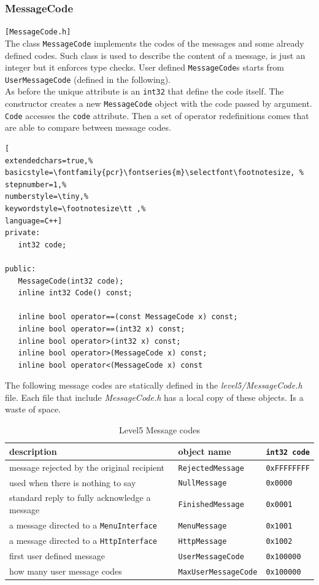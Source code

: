 \subsubsection{MessageCode}
\texttt{[MessageCode.h]}\\
The class \texttt{MessageCode} implements the codes of the messages and some already defined codes. Such class is used to describe the content of a message, is just an integer but it enforces type checks. User defined \texttt{MessageCode}s starts from \texttt{UserMessageCode} (defined in the following). \\


As before the unique attribute is an \texttt{int32} that define the code itself. The constructor creates a new \texttt{MessageCode} object with the code passed by argument. \texttt{Code} accesses the \texttt{code} attribute. Then a set of operator redefinitions comes that are able to compare between message codes.
\begin{lstlisting}[
extendedchars=true,%
basicstyle=\fontfamily{pcr}\fontseries{m}\selectfont\footnotesize, %
stepnumber=1,%
numberstyle=\tiny,%
keywordstyle=\footnotesize\tt ,%
language=C++]
private:
   int32 code;

public:
   MessageCode(int32 code);
   inline int32 Code() const;

   inline bool operator==(const MessageCode x) const;
   inline bool operator==(int32 x) const;
   inline bool operator>(int32 x) const;
   inline bool operator>(MessageCode x) const;
   inline bool operator<(MessageCode x) const
\end{lstlisting}

The following message codes are statically defined in the \textit{level5/MessageCode.h} file. Each file that include \textit{MessageCode.h} has a local copy of these objects. Is a waste of space.

\begin{table}[!h]
 \begin{center}
  \begin{tabular}{|l|l|l|}
   \hline
description & object name & \texttt{int32 code} \\
    \hline
message rejected by the original recipient & \texttt{RejectedMessage} & \texttt{0xFFFFFFFF} \\
used when there is nothing to say & \texttt{NullMessage} & \texttt{0x0000} \\
standard reply to fully acknowledge a message & \texttt{FinishedMessage} & \texttt{0x0001} \\
a message directed to a \texttt{MenuInterface} & \texttt{MenuMessage} & \texttt{0x1001} \\
a message directed to a \texttt{HttpInterface} & \texttt{HttpMessage} & \texttt{0x1002} \\
first user defined message & \texttt{UserMessageCode} & \texttt{0x100000} \\
how many user message codes & \texttt{MaxUserMessageCode} & \texttt{0x100000} \\
    \hline
    \end{tabular}
   \end{center}
  \caption{Level5 Message codes}
 \label{t:level5:MSGCode}
\end{table}

